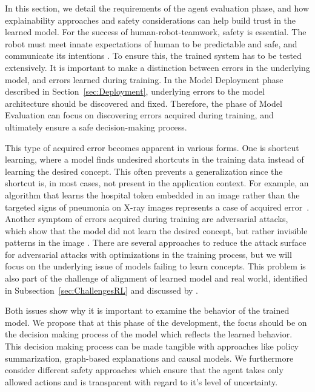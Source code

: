\documentclass[twoside,11pt]{article}
\begin{document}
In this section, we detail the requirements of the agent evaluation phase, and how explainability approaches and safety considerations can help build trust in the learned model. For the success of human-robot-teamwork, safety is essential. The robot must meet innate expectations of human to be predictable and safe, and communicate its intentions \citep{EderHarperLeonards:2014:HITLRoboticsSafetyAssurance}. To ensure this, the trained system has to be tested extensively. It is important to make a distinction between errors in the underlying model, and errors learned during training. In the Model Deployment phase described in Section~\ref{sec:Deployment}, underlying errors to the model architecture should be discovered and fixed. Therefore, the phase of Model Evaluation can focus on discovering errors acquired during training, and ultimately ensure a safe decision-making process.

This type of acquired error becomes apparent in various forms. One is shortcut learning, where a model finds undesired shortcuts in the training data instead of learning the desired concept. This often prevents a generalization since the shortcut is, in most cases, not present in the application context. For example, an algorithm that learns the hospital token embedded in an image rather than the targeted signs of pneumonia on X-ray images represents a case of acquired error~\citep{GeirhosEtAl:2020:ShortcutLearningDNN}. 
Another symptom of errors acquired during training are adversarial attacks, which show that the model did not learn the desired concept, but rather invisible patterns in the image \citep{GoodfellowShlensSzegedy:2014:AdversarialExamples}. There are several approaches to reduce the attack surface for adversarial attacks with optimizations in the training process, but we will focus on the underlying issue of models failing to learn concepts. This problem is also part of the challenge of alignment of learned model and real world, identified in Subsection~\ref{sec:ChallengesRL} and discussed by \citet{RoyEtAl:2021:RLRoboticsChallenges}.


Both issues show why it is important to examine the behavior of the trained model. We propose that at this phase of the development, the focus should be on the decision making process of the model which reflects the learned behavior. This decision making process can be made tangible with approaches like policy summarization, graph-based explanations and causal models. We furthermore consider different safety approaches which ensure that the agent takes only allowed actions and is transparent with regard to it's level of uncertainty.
\end{document}
